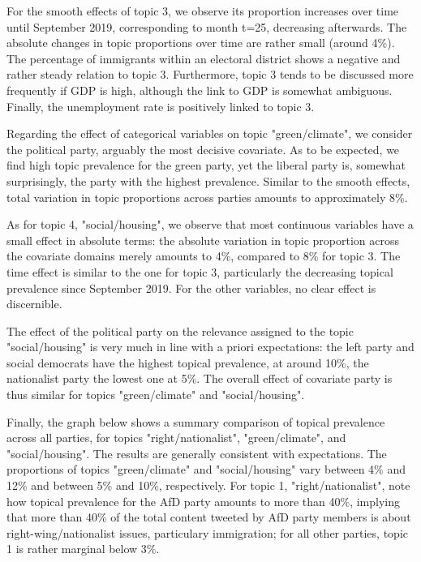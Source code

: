 For the smooth effects of topic 3, we observe its proportion increases over time until September 2019, corresponding to month t=25, decreasing afterwards. The absolute changes in topic proportions over time are rather small (around 4\%). The percentage of immigrants within an electoral district shows a negative and rather steady relation to topic 3. Furthermore, topic 3 tends to be discussed more frequently if GDP is high, although the link to GDP is somewhat ambiguous. Finally, the unemployment rate is positively linked to topic 3.

Regarding the effect of categorical variables on topic "green/climate", we consider the political party, arguably the most decisive covariate. As to be expected, we find high topic prevalence for the green party, yet the liberal party is, somewhat surprisingly, the party with the highest prevalence. Similar to the smooth effects, total variation in topic proportions across parties amounts to approximately 8\%.

As for topic 4, "social/housing", we observe that most continuous variables have a small effect in absolute terms: the absolute variation in topic proportion across the covariate domains merely amounts to 4\%, compared to 8\% for topic 3. The time effect is similar to the one for topic 3, particularly the decreasing topical prevalence since September 2019. For the other variables, no clear effect is discernible.

The effect of the political party on the relevance assigned to the topic "social/housing" is very much in line with a priori expectations: the left party and social democrats have the highest topical prevalence, at around 10\%, the nationalist party the lowest one at 5\%. The overall effect of covariate party is thus similar for topics "green/climate" and "social/housing".

Finally, the graph below shows a summary comparison of topical prevalence across all parties, for topics "right/nationalist", "green/climate", and "social/housing". The results are generally consistent with expectations. The proportions of topics "green/climate" and "social/housing" vary between 4\% and 12\% and between 5\% and 10\%, respectively. For topic 1,  "right/nationalist", note how topical prevalence for the AfD party amounts to more than 40\%, implying that more than 40\% of the total content tweeted by AfD party members is about right-wing/nationalist issues, particulary immigration; for all other parties, topic 1 is rather marginal below 3\%.

